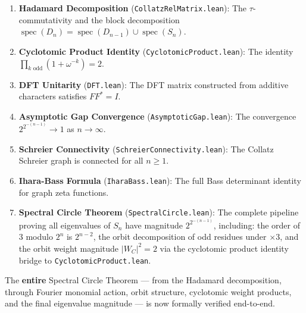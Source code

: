 \documentclass[11pt,reqno]{amsart}
\theoremstyle{definition}
\begin{document}
\begin{enumerate}
\item \textbf{Hadamard Decomposition} (\texttt{CollatzRelMatrix.lean}): The $\tau$-commutativity and the block decomposition $\operatorname{spec}(D_n) = \operatorname{spec}(D_{n-1}) \cup \operatorname{spec}(S_n)$.
\item \textbf{Cyclotomic Product Identity} (\texttt{CyclotomicProduct.lean}): The identity $\prod_{k \text{ odd}} (1 + \omega^{-k}) = 2$.
\item \textbf{DFT Unitarity} (\texttt{DFT.lean}): The DFT matrix constructed from additive characters satisfies $FF^* = I$.
\item \textbf{Asymptotic Gap Convergence} (\texttt{AsymptoticGap.lean}): The convergence $2^{2^{-(n-1)}} \to 1$ as $n \to \infty$.
\item \textbf{Schreier Connectivity} (\texttt{SchreierConnectivity.lean}): The Collatz Schreier graph is connected for all $n \ge 1$.
\item \textbf{Ihara-Bass Formula} (\texttt{IharaBass.lean}): The full Bass determinant identity for graph zeta functions.
\item \textbf{Spectral Circle Theorem} (\texttt{SpectralCircle.lean}): The complete pipeline proving all eigenvalues of $S_n$ have magnitude $2^{2^{-(n-1)}}$, including: the order of 3 modulo $2^n$ is $2^{n-2}$, the orbit decomposition of odd residues under $\times 3$, and the orbit weight magnitude $|W_C|^2 = 2$ via the cyclotomic product identity bridge to \texttt{CyclotomicProduct.lean}.
\end{enumerate}

The \textbf{entire} Spectral Circle Theorem --- from the Hadamard decomposition, through Fourier monomial action, orbit structure, cyclotomic weight products, and the final eigenvalue magnitude --- is now formally verified end-to-end.

\end{document}
